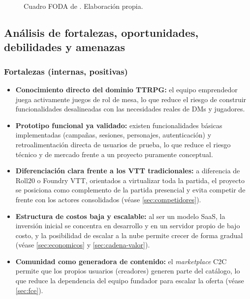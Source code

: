 \begin{figure}[htbp]
\caption{Cuadro FODA de \nombreproyecto{}. Elaboración propia.}
\label{fig:foda}
\end{figure}

\subsection{Análisis de fortalezas, oportunidades, debilidades y amenazas}

\subsubsection{Fortalezas (internas, positivas)}
\begin{itemize}
  \item \textbf{Conocimiento directo del dominio TTRPG:} el equipo emprendedor juega activamente juegos de rol de mesa, lo que reduce el riesgo de construir funcionalidades desalineadas con las necesidades reales de DMs y jugadores.
  \item \textbf{Prototipo funcional ya validado:} existen funcionalidades básicas implementadas (campañas, sesiones, personajes, autenticación) y retroalimentación directa de usuarios de prueba, lo que reduce el riesgo técnico y de mercado frente a un proyecto puramente conceptual.
  \item \textbf{Diferenciación clara frente a los VTT tradicionales:} a diferencia de Roll20 o Foundry VTT, orientados a virtualizar toda la partida, el proyecto se posiciona como complemento de la partida presencial y evita competir de frente con los actores consolidados (véase \ref{sec:competidores}).
  \item \textbf{Estructura de costos baja y escalable:} al ser un modelo SaaS, la inversión inicial se concentra en desarrollo y en un servidor propio de bajo costo, y la posibilidad de escalar a la nube permite crecer de forma gradual (véase \ref{sec:economicos} y \ref{sec:cadena-valor}).
  \item \textbf{Comunidad como generadora de contenido:} el \textit{marketplace} C2C permite que los propios usuarios (creadores) generen parte del catálogo, lo que reduce la dependencia del equipo fundador para escalar la oferta (véase \ref{sec:fce}).
\end{itemize}

